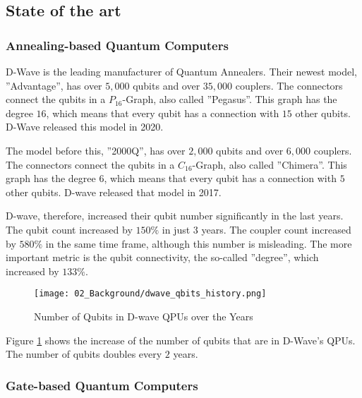 


\subsection{State of the art}

\subsubsection{Annealing-based Quantum Computers}

D-Wave is the leading manufacturer of Quantum Annealers.
Their newest model, ''Advantage'', has over $5, 000$ qubits and over $35, 000$ couplers.
The connectors connect the qubits in a $P_{16}$-Graph, also called ''Pegasus''.
This graph has the degree $16$, which means that every qubit has a connection with $15$ other qubits.
D-Wave released this model in 2020.
\cite{D-Wave2020, Zbinden2020}

The model before this, ''2000Q'', has over $2, 000$ qubits and over $6, 000$ couplers.
The connectors connect the qubits in a $C_{16}$-Graph, also called ''Chimera''.
This graph has the degree $6$, which means that every qubit has a connection with $5$ other qubits.
D-wave released that model in 2017.
\cite{D-Wave2020, Zbinden2020}

D-wave, therefore, increased their qubit number significantly in the last years.
The qubit count increased by $150\%$ in just $3$ years.
The coupler count increased by $580\%$ in the same time frame, although this number is misleading.
The more important metric is the qubit connectivity, the so-called ''degree'', which increased by $133\%$.

\begin{figure}[!h]
  \centering
  \texttt{[image: 02\_Background/dwave\_qbits\_history.png]}
  \caption{Number of Qubits in D-wave QPUs over the Years \cite{D-Wave2018, D-Wave2020}}
  \label{figure:annealing.processors.history}
\end{figure}

Figure \ref{figure:annealing.processors.history} shows the increase of the number of qubits that are in D-Wave's QPUs.
The number of qubits doubles every $2$ years.

\subsubsection{Gate-based Quantum Computers}

